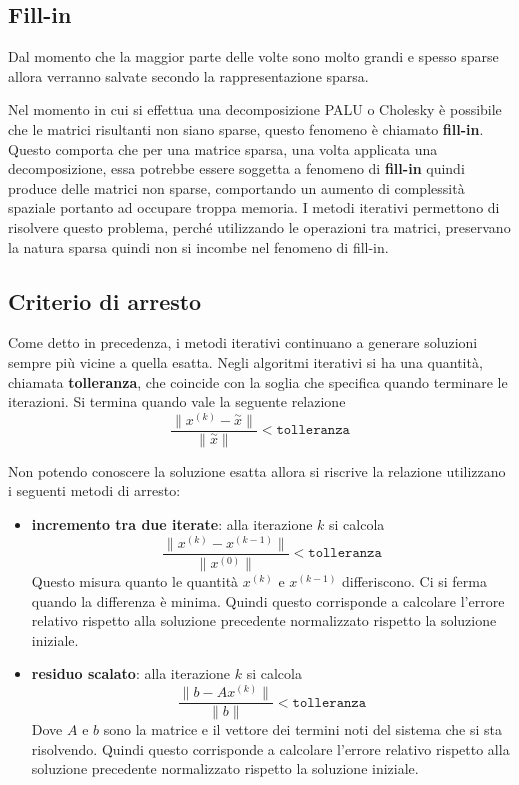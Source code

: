 \subsection{Fill-in}
Dal momento che la maggior parte delle volte sono molto grandi e spesso sparse 
allora verranno salvate secondo la rappresentazione sparsa. 

Nel momento in cui si effettua una decomposizione PALU o Cholesky è possibile che 
le matrici risultanti non siano sparse, questo fenomeno è chiamato \textbf{fill-in}.
Questo comporta che per una matrice sparsa, una volta applicata una decomposizione,
essa potrebbe essere soggetta a fenomeno di \textbf{fill-in} quindi produce 
delle matrici non sparse, comportando un aumento di complessità spaziale portanto 
ad occupare troppa memoria. I metodi iterativi permettono di risolvere questo problema,
perché utilizzando le operazioni tra matrici, preservano la natura sparsa quindi 
non si incombe nel fenomeno di fill-in.

\subsection{Criterio di arresto}
Come detto in precedenza, i metodi iterativi continuano a generare soluzioni sempre 
più vicine a quella esatta. 
Negli algoritmi iterativi si ha una quantità, chiamata \textbf{tolleranza}, che
coincide con la soglia che specifica quando terminare le iterazioni. Si termina 
quando vale la seguente relazione
$$\frac{\|x^{(k)}-\stackrel{\sim}{x}\|}{\|\stackrel{\sim}{x}\|} < \texttt{tolleranza}$$

Non potendo conoscere la soluzione esatta allora si riscrive la relazione utilizzano i seguenti metodi 
di arresto:
\begin{itemize}
    \item \textbf{incremento tra due iterate}: alla iterazione $k$ si calcola
    $$\frac{\|x^{(k)}-x^{(k-1)}\|}{\|x^{(0)}\|}< \texttt{tolleranza}$$
    Questo misura quanto le quantità $x^{(k)}$ e $x^{(k-1)}$ differiscono. Ci si 
    ferma quando la differenza è minima. Quindi questo corrisponde a calcolare l'errore relativo rispetto alla soluzione 
    precedente normalizzato rispetto la soluzione iniziale.
    \item \textbf{residuo scalato}: alla iterazione $k$ si calcola
    $$\frac{\|b- Ax^{(k)}\|}{\|b\|}< \texttt{tolleranza}$$
    Dove $A$ e $b$ sono la matrice e il vettore dei termini noti del sistema che 
    si sta risolvendo. Quindi questo corrisponde a calcolare l'errore relativo rispetto alla soluzione 
    precedente normalizzato rispetto la soluzione iniziale.
    
\end{itemize}

